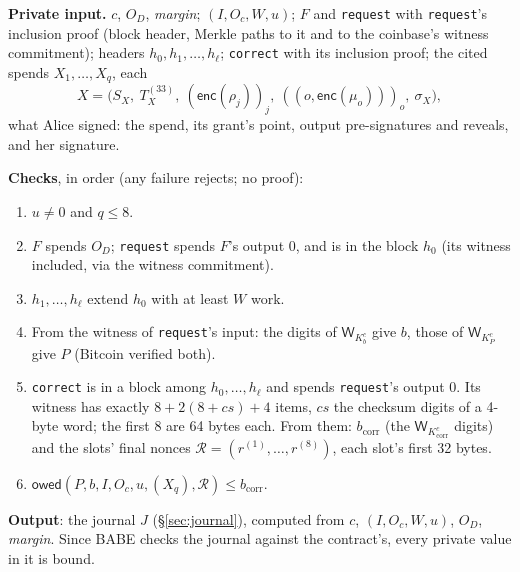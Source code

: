 \documentclass[11pt]{article}
\theoremstyle{plain}
\theoremstyle{definition}
\newcommand{\bcorr}{b_{\mathrm{corr}}}
\newcommand{\tx}[1]{\texttt{#1}}
\newcommand{\Wots}{\mathsf{W}}
\newcommand{\owed}{\mathsf{owed}}
\newcommand{\enc}{\mathsf{enc}}
\newcommand{\Oc}{O_c}
\begin{document}
\textbf{Private input.} $c$, $O_D$, \emph{margin}; $(I, \Oc, W, u)$;
$F$ and \tx{request} with \tx{request}'s inclusion proof (block header,
Merkle paths to it and to the coinbase's witness commitment); headers
$h_0, h_1, \dots, h_\ell$; \tx{correct} with its inclusion proof; the
cited spends $X_1, \dots, X_q$, each
\[
  X = \big(S_X,\ T_X^{(33)},\ (\enc(\rho_j))_j,\ ((o, \enc(\mu_o)))_o,\
  \sigma_X\big),
\]
what Alice signed: the spend, its grant's point, output pre-signatures
and reveals, and her signature.

\textbf{Checks}, in order (any failure rejects; no proof):
\begin{enumerate}[nosep]
\item $u \ne 0$ and $q \le 8$.
\item $F$ spends $O_D$; \tx{request} spends $F$'s output 0, and is in
  the block $h_0$ (its witness included, via the witness commitment).
\item $h_1, \dots, h_\ell$ extend $h_0$ with at least $W$ work.
\item From the witness of \tx{request}'s input: the digits of
  $\Wots_{K_b^c}$ give $b$, those of $\Wots_{K_P^c}$ give $P$ (Bitcoin
  verified both).
\item \tx{correct} is in a block among $h_0, \dots, h_\ell$ and spends
  \tx{request}'s output 0. Its witness has exactly $8 + 2(8 +
  \mathit{cs}) + 4$ items, $\mathit{cs}$ the checksum digits of a
  4-byte word; the first 8 are 64 bytes each. From them:
  $\bcorr$ (the $\Wots_{K_{\mathrm{corr}}^c}$ digits) and the slots' final nonces
  $\mathcal{R} = (r^{(1)}, \dots, r^{(8)})$, each slot's first 32 bytes.
\item $\owed(P, b, I, \Oc, u, (X_q), \mathcal{R}) \le \bcorr$.
\end{enumerate}
\textbf{Output}: the journal $J$ (\S\ref{sec:journal}), computed from
$c$, $(I, \Oc, W, u)$, $O_D$, \emph{margin}. Since BABE checks the
journal against the contract's, every private value in it is bound.
\end{document}

